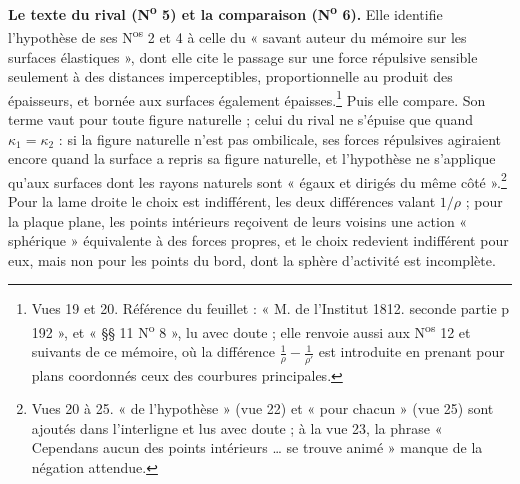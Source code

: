 \documentclass[11pt,a4paper]{article}
\begin{document}
\textbf{Le texte du rival (N\textsuperscript{o} 5) et la comparaison
(N\textsuperscript{o} 6).} Elle identifie l'hypothèse de ses
N\textsuperscript{os} 2 et 4 à celle du « savant auteur du mémoire sur les
surfaces élastiques », dont elle cite le passage sur une force répulsive
sensible seulement à des distances imperceptibles, proportionnelle au produit
des épaisseurs, et bornée aux surfaces également épaisses.\footnote{Vues 19 et
20. Référence du feuillet : « M. de l'Institut 1812. seconde partie p 192 », et
« §§ 11 N\textsuperscript{o} 8 », lu avec doute ; elle renvoie aussi aux N\textsuperscript{os} 12
et suivants de ce mémoire, où la différence $\frac1\rho - \frac1{\rho'}$ est
introduite en prenant pour plans coordonnés ceux des courbures principales.}
Puis elle compare. Son terme vaut pour toute figure naturelle ; celui du rival
ne s'épuise que quand $\kappa_1 = \kappa_2$ : si la figure naturelle n'est pas
ombilicale, ses forces répulsives agiraient encore quand la surface a repris sa
figure naturelle, et l'hypothèse ne s'applique qu'aux surfaces dont les rayons
naturels sont « égaux et dirigés du même côté ».\footnote{Vues 20 à 25. « de l'hypothèse » (vue 22) et « pour
chacun » (vue 25) sont ajoutés dans l'interligne et lus avec doute ; à la vue 23, la phrase
« Cependans aucun des points intérieurs … se trouve animé » manque de la
négation attendue.} Pour la lame droite le choix est indifférent, les deux
différences valant $1/\rho$ ; pour la plaque plane, les points intérieurs
reçoivent de leurs voisins une action « sphérique » équivalente à des forces
propres, et le choix redevient indifférent pour eux, mais non pour les points
du bord, dont la sphère d'activité est incomplète.
\end{document}
